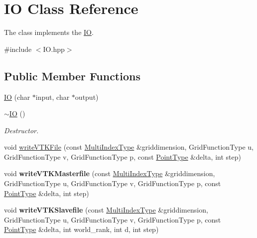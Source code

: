 \hypertarget{class_i_o}{\section{I\-O Class Reference}
\label{class_i_o}
}


The class implements the \hyperlink{class_i_o}{I\-O}.  




{\ttfamily \#include $<$I\-O.\-hpp$>$}

\subsection*{Public Member Functions}
\begin{DoxyCompactItemize}
\item 
\hyperlink{class_i_o_ac100fd32b66e2c0e1ad53fdcd15a1b99}{I\-O} (char $\ast$input, char $\ast$output)
\item 
\hypertarget{class_i_o_a44861ff225d351615179f0f24cb8d7f6}{\hyperlink{class_i_o_a44861ff225d351615179f0f24cb8d7f6}{$\sim$\-I\-O} ()}\label{class_i_o_a44861ff225d351615179f0f24cb8d7f6}

\begin{DoxyCompactList}\small\item\em Destructor. \end{DoxyCompactList}\item 
void \hyperlink{class_i_o_a3484172971065b005ef6bfa8f42febef}{write\-V\-T\-K\-File} (const \hyperlink{class_array}{Multi\-Index\-Type} \&griddimension, Grid\-Function\-Type u, Grid\-Function\-Type v, Grid\-Function\-Type p, const \hyperlink{class_array}{Point\-Type} \&delta, int step)
\item 
\hypertarget{class_i_o_a900423d1c5042730a7f2b3fe3bc46914}{void {\bfseries write\-V\-T\-K\-Masterfile} (const \hyperlink{class_array}{Multi\-Index\-Type} \&griddimension, Grid\-Function\-Type u, Grid\-Function\-Type v, Grid\-Function\-Type p, const \hyperlink{class_array}{Point\-Type} \&delta, int step)}\label{class_i_o_a900423d1c5042730a7f2b3fe3bc46914}

\item 
\hypertarget{class_i_o_a2c32eb55116d14193a0c7a0a23e27f42}{void {\bfseries write\-V\-T\-K\-Slavefile} (const \hyperlink{class_array}{Multi\-Index\-Type} \&griddimension, Grid\-Function\-Type u, Grid\-Function\-Type v, Grid\-Function\-Type p, const \hyperlink{class_array}{Point\-Type} \&delta, int world\-\_\-rank, int d, int step)}\label{class_i_o_a2c32eb55116d14193a0c7a0a23e27f42}

\end{DoxyCompactItemize}
